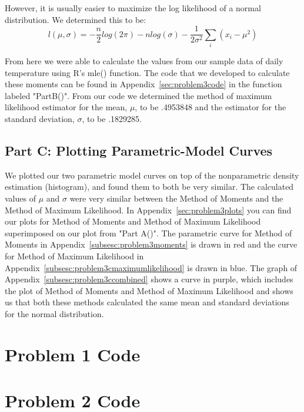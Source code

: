 \documentclass[11pt]{article}
\begin{document}
However, it is usually easier to maximize the log likelihood of a normal distribution. We determined this to be:
\begin{equation}
l(\mu,\sigma) = -\frac{n}{2}log(2\pi) - nlog(\sigma) - \frac{1}{2\sigma^{2}}\sum_{i}(x_i-\mu^2)
\end{equation} 

From here we were able to calculate the values from our sample data of daily temperature using R's mle() function. The code that we developed to calculate these moments can be found in Appendix~\ref{sec:problem3code} in the function labeled "PartB()". From our code we determined the method of maximum likelihood estimator for the mean, $\mu$, to be .4953848 and the estimator for the standard deviation, $\sigma$, to be .1829285. 


\subsection{Part C: Plotting Parametric-Model Curves}
\label{subsec:3c}
We plotted our two parametric model curves on top of the nonparametric density estimation (histogram), and found them to both be very similar. The calculated values of $\mu$ and $\sigma$ were very similar between the Method of Moments and the Method of Maximum Likelihood. In Appendix~\ref{sec:problem3plots} you can find our plots for Method of Moments and Method of Maximum Likelihood superimposed on our plot from "Part A()". The parametric curve for Method of Moments in Appendix~\ref{subsesc:problem3moments} is drawn in red and the curve for Method of Maximum Likelihood in Appendix~\ref{subsesc:problem3cmaximumlikelihood} is drawn in blue. The graph of Appendix~\ref{subsesc:problem3ccombined} shows a curve in purple, which includes the plot of Method of Moments and Method of Maximum Likelihood and shows us that both these methods calculated the same mean and standard deviations for the normal distribution.

\pagebreak

\appendix
\section{Problem 1 Code}
\label{sec:problem1code}

\pagebreak

\section{Problem 2 Code}
\label{sec:problem2code}

\pagebreak
\end{document}
